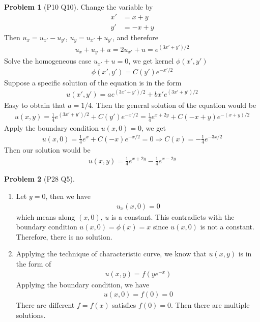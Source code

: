 \documentclass[twoside,11pt]{article}
\theoremstyle{definition}
\newtheorem{problem}{Problem}
\theoremstyle{remark}
\begin{document}
\begin{problem}[P10 Q10]
Change the variable by
\begin{align*}
    x' &= x + y\\
    y' &= -x + y
\end{align*}
Then $u_x=u_{x'}-u_{y'}$, $u_y=u_{x'}+u_{y'}$, and therefore
\begin{align*}
    u_x + u_y + u= 2u_{x'} + u = e^{(3x'+y')/2}
\end{align*}
Solve the homogeneous case $u_{x'}+u=0$, we get kernel $\phi(x',y')$
\begin{align*}
    \phi(x',y')=C(y')e^{-x'/2}
\end{align*}
Suppose a specific solution of the equation is in the form 
\begin{align*}
    u(x',y') = ae^{(3x'+y')/2} + bx'e^{(3x'+y')/2}
\end{align*}
Easy to obtain that $a=1/4$.
Then the general solution of the equation would be
\begin{align*}
    u(x,y) = \frac{1}{4}e^{(3x'+y')/2} + C(y')e^{-x'/2}
    =\frac{1}{4}e^{x+2y} + C(-x+y)e^{-(x+y)/2}
\end{align*}
Apply the boundary condition $u(x,0)=0$, we get
\begin{align*}
    u(x,0) = \frac{1}{4}e^{x} + C(-x)e^{-x/2} = 0\Rightarrow
    C(x)=-\frac{1}{4}e^{-3x/2}
\end{align*}
Then our solution would be
\begin{align*}
    u(x,y) = \frac{1}{4}e^{x+2y} - \frac{1}{4}e^{x-2y}
\end{align*}
\end{problem}

\begin{problem}[P28 Q5]\
    \begin{enumerate}[label=(\alph*)]
        \item Let $y=0$, then we have
        \begin{align*}
            u_{x}(x, 0) = 0
        \end{align*}
        which means along $(x, 0)$, $u$ is a constant.
        This contradicts with the boundary condition $u(x,0)=\phi(x)=x$ since
        $u(x, 0)$ is not a constant.
        Therefore, there is no solution.

        \item Applying the technique of characteristic curve, we know that
        $u(x,y)$ is in the form of
        \begin{align*}
            u(x, y) = f(ye^{-x})
        \end{align*}
        Applying the boundary condition, we have
        \begin{align*}
            u(x,0) = f(0) = 0
        \end{align*}
        There are different $f=f(x)$ satisfies $f(0)=0$.
        Then there are multiple solutions.
    \end{enumerate}
\end{problem}
\end{document}
